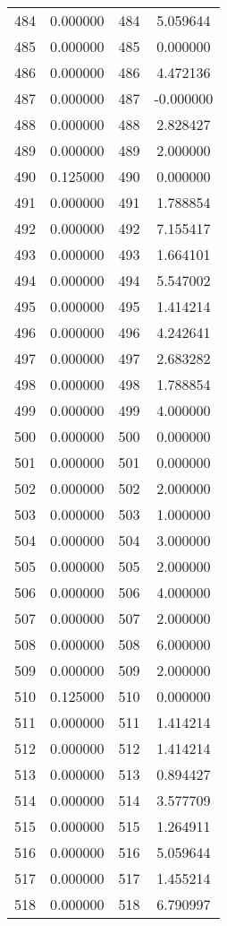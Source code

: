 \documentclass[12pt]{article}
\begin{document}
\begin{longtable}{@{}cccc@{}}
484 & 0.000000 & 484 & 5.059644 \\
485 & 0.000000 & 485 & 0.000000 \\
486 & 0.000000 & 486 & 4.472136 \\
487 & 0.000000 & 487 & -0.000000 \\
488 & 0.000000 & 488 & 2.828427 \\
489 & 0.000000 & 489 & 2.000000 \\
490 & 0.125000 & 490 & 0.000000 \\
491 & 0.000000 & 491 & 1.788854 \\
492 & 0.000000 & 492 & 7.155417 \\
493 & 0.000000 & 493 & 1.664101 \\
494 & 0.000000 & 494 & 5.547002 \\
495 & 0.000000 & 495 & 1.414214 \\
496 & 0.000000 & 496 & 4.242641 \\
497 & 0.000000 & 497 & 2.683282 \\
498 & 0.000000 & 498 & 1.788854 \\
499 & 0.000000 & 499 & 4.000000 \\
500 & 0.000000 & 500 & 0.000000 \\
501 & 0.000000 & 501 & 0.000000 \\
502 & 0.000000 & 502 & 2.000000 \\
503 & 0.000000 & 503 & 1.000000 \\
504 & 0.000000 & 504 & 3.000000 \\
505 & 0.000000 & 505 & 2.000000 \\
506 & 0.000000 & 506 & 4.000000 \\
507 & 0.000000 & 507 & 2.000000 \\
508 & 0.000000 & 508 & 6.000000 \\
509 & 0.000000 & 509 & 2.000000 \\
510 & 0.125000 & 510 & 0.000000 \\
511 & 0.000000 & 511 & 1.414214 \\
512 & 0.000000 & 512 & 1.414214 \\
513 & 0.000000 & 513 & 0.894427 \\
514 & 0.000000 & 514 & 3.577709 \\
515 & 0.000000 & 515 & 1.264911 \\
516 & 0.000000 & 516 & 5.059644 \\
517 & 0.000000 & 517 & 1.455214 \\
518 & 0.000000 & 518 & 6.790997 \\

\end{longtable}
\end{document}

